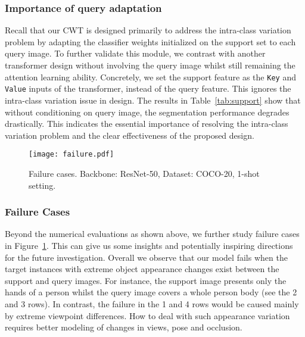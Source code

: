 \documentclass[10pt,twocolumn,letterpaper]{article}
\begin{document}
\vspace{-0.3cm}

\subsubsection{Importance of query adaptation}
Recall that our CWT is designed primarily to address the intra-class variation problem by adapting the classifier weights initialized on the support set to each query image.
To further validate this module,
we contrast with another transformer design without involving
the query image whilst still remaining the attention learning ability.
Concretely, we set the support feature as the \texttt{Key} and \texttt{Value} inputs of the transformer, instead of the query feature.
This ignores the intra-class variation issue in design.
The results in Table~\ref{tab:support} show that 
without conditioning on query image, the segmentation performance degrades drastically. 
This indicates the essential importance of resolving the intra-class
variation problem and the clear effectiveness of the proposed design.











\begin{figure}
    \centering
    \texttt{[image: failure.pdf]}
    \caption{Failure cases.
    Backbone: ResNet-50,
    Dataset: COCO-20,
    1-shot setting.
    }
    \label{fig:failure}
\end{figure}

\vspace{-0.3cm}

\subsubsection{Failure Cases}
Beyond the numerical evaluations as shown above,
we further study failure cases in Figure~\ref{fig:failure}.
This can give us some insights and potentially inspiring directions for the future investigation. Overall we observe that 
our model fails when the target instances with extreme object appearance changes exist between the support and query images.
For instance, the support image presents only the hands of a person whilst the query image covers a whole person body (see the 2 and 3 rows).
In contrast, the failure in the 1 and 4 rows would be caused mainly by extreme viewpoint differences.
How to deal with such appearance variation requires better modeling of changes in views, pose and occlusion. 
\end{document}
